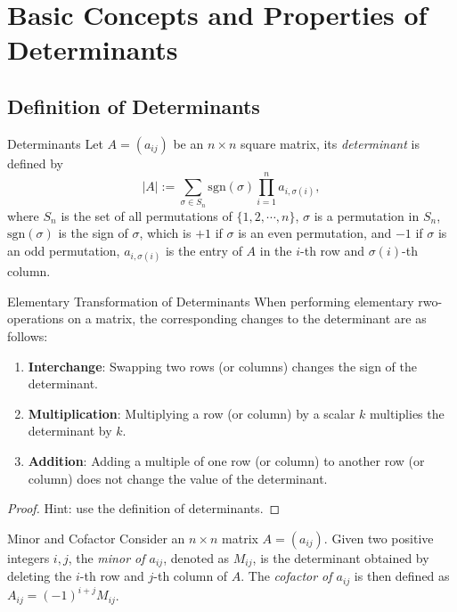 
\section{Basic Concepts and Properties of Determinants}

\subsection{Definition of Determinants}

\begin{definition}{Determinants}{}
  Let $A = (a_{ij})$ be an $n \times n$ square matrix,
  its \emph{determinant} is defined by
  \begin{equation}
    |A| := \sum\limits_{\sigma \in S_n} \mathrm{sgn}(\sigma) \prod\limits_{i = 1}^n a_{i, \sigma(i)},
  \end{equation}
  where $S_n$ is the set of all permutations of $\{1, 2, \cdots, n\}$,
  $\sigma$ is a permutation in $S_n$,
  $\mathrm{sgn}(\sigma)$ is the sign of $\sigma$,
  which is $+1$ if $\sigma$ is an even permutation,
  and $-1$ if $\sigma$ is an odd permutation,
  $a_{i, \sigma(i)}$ is the entry of $A$ in the $i$-th row and $\sigma(i)$-th column.
\end{definition}

\begin{proposition}{Elementary Transformation of Determinants}{}
  When performing elementary rwo-operations on a matrix,
  the corresponding changes to the determinant are as follows:
  \begin{enumerate}
  \item \textbf{Interchange}: Swapping two rows (or columns) changes the sign of
    the determinant.
  \item \textbf{Multiplication}: Multiplying a row (or column) by a scalar $k$
    multiplies the determinant by $k$.
  \item \textbf{Addition}: Adding a multiple of one row (or column) to another
    row (or column) does not change the value of the determinant.
  \end{enumerate}
\end{proposition}

\begin{proof}
  Hint: use the definition of determinants.
\end{proof}

\begin{definition}{Minor and Cofactor}{}
  Consider an $n \times n$ matrix $A = (a_{ij})$.
  Given two positive integers $i,j$,
  the \emph{minor of $a_{ij}$}, denoted as $M_{ij}$,
  is the determinant obtained by deleting the $i$-th row
  and $j$-th column of $A$.
  The \emph{cofactor of $a_{ij}$} is then defined as $A_{ij} = (-1)^{i+j}M_{ij}$.
\end{definition}

